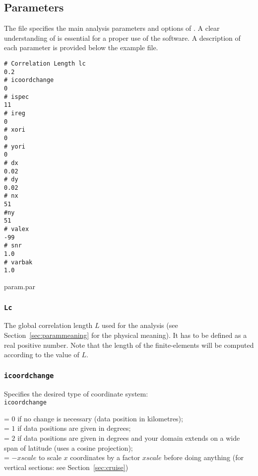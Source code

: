 \subsection{Parameters\label{sec:param.par}}

The file  specifies the main analysis parameters and options of \diva. A clear understanding of is essential for a proper use of the software. A description of each parameter is provided below the example file.

\begin{exfile}[htpb]
\begin{verbatim}
# Correlation Length lc
0.2
# icoordchange
0
# ispec
11
# ireg
0
# xori
0
# yori
0
# dx
0.02
# dy
0.02
# nx
51
#ny
51
# valex
-99
# snr
1.0
# varbak
1.0
\end{verbatim}
\caption{param.par\label{paramfile}}
\end{exfile}


\subsubsection{\texttt{Lc}}

The global correlation length $L$  used for the analysis (see Section~\ref{sec:parammeaning} for the physical meaning). It has to be defined as a real positive number. Note that the length of the finite-elements will be computed according to the value of $L$.

\subsubsection{\texttt{icoordchange}\label{sec:icoord}}


Specifies the desired type of coordinate system:\\

\texttt{icoordchange} \begin{minipage}[t]{.7\textwidth} = $0$ if no change is necessary (data position in kilometres);\\
                                                        = $1$ if data positions are given in degrees;\\
                                                        = $2$ if data positions are given in degrees and your domain extends on a wide span of latitude                                                           (uses a cosine projection);\\
                                                        = $-xscale$ to scale $x$ coordinates by a factor $xscale$ before doing anything (for vertical sections: see Section~\ref{sec:cruise})
                      \end{minipage}
                      
